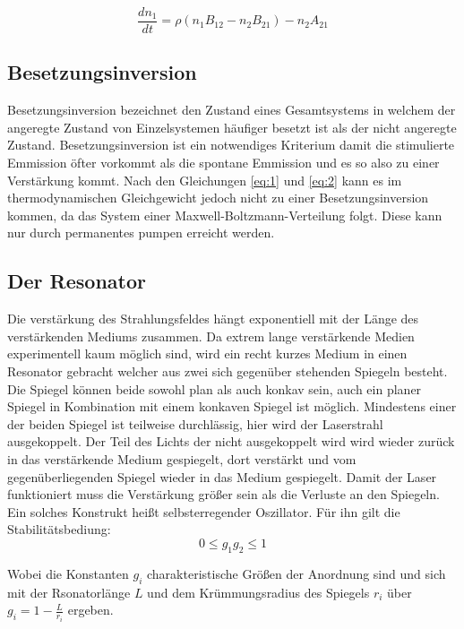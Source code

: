 \begin{equation}
    \label{eq:2}
    \frac{dn_1}{dt}=\rho(n_1B_{12}-n_2B_{21})-n_2A_{21}
\end{equation}


\subsection{Besetzungsinversion}
\label{sec:Besetzungsinversion}
Besetzungsinversion bezeichnet den Zustand eines Gesamtsystems in welchem der angeregte Zustand von 
Einzelsystemen häufiger besetzt ist als der nicht angeregte Zustand. Besetzungsinversion ist ein notwendiges
Kriterium damit die stimulierte Emmission öfter vorkommt als die spontane Emmission und es so also zu einer
Verstärkung kommt. Nach den Gleichungen \autoref{eq:1} und \autoref{eq:2} kann es im thermodynamischen
Gleichgewicht jedoch nicht zu einer Besetzungsinversion kommen, da das System einer Maxwell-Boltzmann-Verteilung 
folgt. Diese kann nur durch permanentes pumpen erreicht werden. 

\subsection{Der Resonator}
\label{sec:Resonator}
Die verstärkung des Strahlungsfeldes hängt exponentiell mit der Länge des verstärkenden Mediums zusammen.
Da extrem lange verstärkende Medien experimentell kaum möglich sind, wird ein recht kurzes Medium in einen 
Resonator gebracht welcher aus zwei sich gegenüber stehenden Spiegeln besteht. Die Spiegel können beide 
sowohl plan als auch konkav sein, auch ein planer Spiegel in Kombination mit einem konkaven Spiegel ist möglich.
Mindestens einer der beiden Spiegel ist teilweise durchlässig, hier wird der Laserstrahl ausgekoppelt.
Der Teil des Lichts der nicht ausgekoppelt wird wird wieder zurück in das verstärkende Medium gespiegelt,
dort verstärkt und vom gegenüberliegenden Spiegel wieder in das Medium gespiegelt. Damit der Laser funktioniert
muss die Verstärkung größer sein als die Verluste an den Spiegeln. Ein solches Konstrukt heißt selbsterregender
Oszillator. Für ihn gilt die Stabilitätsbediung:
\begin{equation}
    0 \leq g_1g_2 \leq 1
\end{equation}

Wobei die Konstanten $g_i$ charakteristische Größen der Anordnung sind und sich mit der Rsonatorlänge $L$ und dem
Krümmungsradius des Spiegels $r_i$ über $g_i=1-\frac{L}{r_i}$ ergeben.

